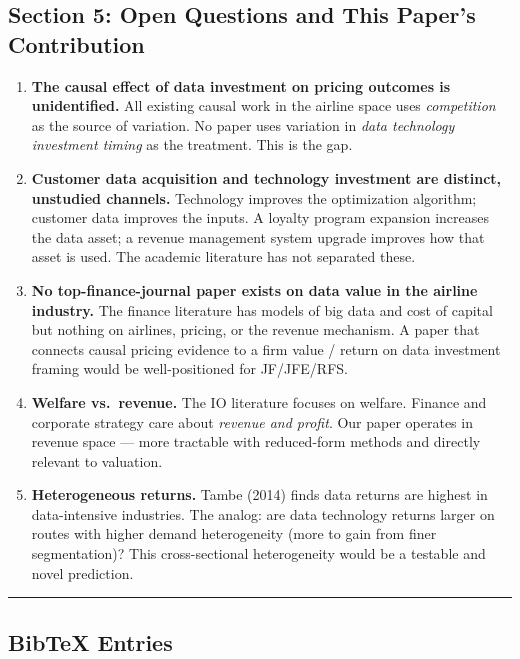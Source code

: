 \documentclass[
]{article}
\begin{document}
\hypertarget{section-5-open-questions-and-this-papers-contribution}{%
\subsection{Section 5: Open Questions and This Paper's
Contribution}\label{section-5-open-questions-and-this-papers-contribution}}

\begin{enumerate}
\def\labelenumi{\arabic{enumi}.}
\item
  \textbf{The causal effect of data investment on pricing outcomes is
  unidentified.} All existing causal work in the airline space uses
  \emph{competition} as the source of variation. No paper uses variation
  in \emph{data technology investment timing} as the treatment. This is
  the gap.
\item
  \textbf{Customer data acquisition and technology investment are
  distinct, unstudied channels.} Technology improves the optimization
  algorithm; customer data improves the inputs. A loyalty program
  expansion increases the data asset; a revenue management system
  upgrade improves how that asset is used. The academic literature has
  not separated these.
\item
  \textbf{No top-finance-journal paper exists on data value in the
  airline industry.} The finance literature has models of big data and
  cost of capital but nothing on airlines, pricing, or the revenue
  mechanism. A paper that connects causal pricing evidence to a firm
  value / return on data investment framing would be well-positioned for
  JF/JFE/RFS.
\item
  \textbf{Welfare vs.~revenue.} The IO literature focuses on welfare.
  Finance and corporate strategy care about \emph{revenue and profit}.
  Our paper operates in revenue space --- more tractable with
  reduced-form methods and directly relevant to valuation.
\item
  \textbf{Heterogeneous returns.} Tambe (2014) finds data returns are
  highest in data-intensive industries. The analog: are data technology
  returns larger on routes with higher demand heterogeneity (more to
  gain from finer segmentation)? This cross-sectional heterogeneity
  would be a testable and novel prediction.
\end{enumerate}

\begin{center}\rule{0.5\linewidth}{0.5pt}\end{center}

\hypertarget{bibtex-entries}{%
\subsection{BibTeX Entries}\label{bibtex-entries}}
\end{document}
